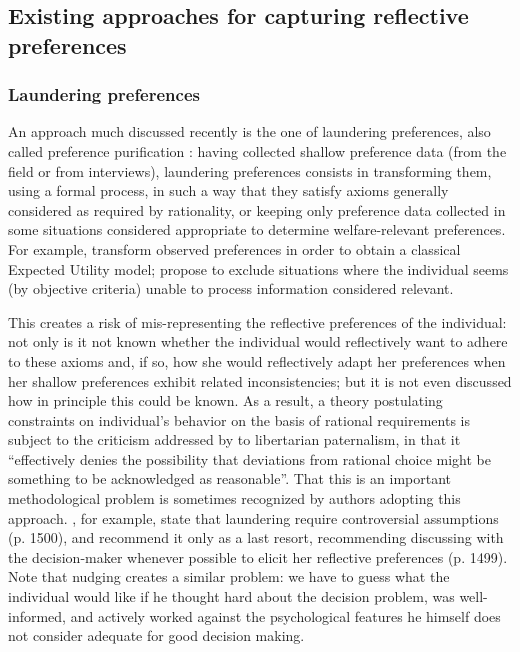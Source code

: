 \documentclass[version=last, pagesize, twoside=off, bibliography=totoc, DIV=calc, fontsize=12pt, a4paper, french, english]{scrartcl}
\begin{document}
\subsection{Existing approaches for capturing reflective preferences}
\subsubsection{Laundering preferences}
An approach much discussed recently is the one of laundering preferences, also called preference purification \citep{bernheim_beyond_2009, rubinstein_eliciting_2011, infante_preference_2016}: having collected shallow preference data (from the field or from interviews), laundering preferences consists in transforming them, using a formal process, in such a way that they satisfy axioms generally considered as required by rationality, or keeping only preference data collected in some situations considered appropriate to determine welfare-relevant preferences. For example, \citet{bleichrodt_making_2001} transform observed preferences in order to obtain a classical Expected Utility model; \citet{bernheim_beyond_2009} propose to exclude situations where the individual seems (by objective criteria) unable to process information considered relevant. 

This creates a risk of mis-representing the reflective preferences of the individual: not only is it not known whether the individual would reflectively want to adhere to these axioms and, if so, how she would reflectively adapt her preferences when her shallow preferences exhibit related inconsistencies; but it is not even discussed how in principle this could be known. As a result, a theory postulating constraints on individual’s behavior on the basis of rational requirements is subject to the criticism addressed by \citet[p.\ 228]{dold_toward_2018} to libertarian paternalism, in that it “effectively denies the possibility that deviations from rational choice might be something to be acknowledged as reasonable”. 
That this is an important methodological problem is sometimes recognized by authors adopting this approach. , for example, state that laundering require controversial assumptions (p. 1500), and recommend it only as a last resort, recommending discussing with the decision-maker whenever possible to elicit her reflective preferences (p. 1499). Note that nudging \citep{thaler_nudge_2009} creates a similar problem: we have to guess what the individual would like if he thought hard about the decision problem, was well-informed, and actively worked against the psychological features he himself does not consider adequate for good decision making.   
\end{document}
